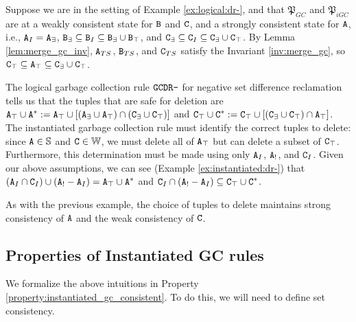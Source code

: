 \begin{example}
Suppose we are in the setting of Example \ref{ex:logical:dr-}, and that $\mathfrak{P}_{GC}$ and $\mathfrak{P}_{iGC}$ are at a weakly consistent state for $\tt{B}$ and $\tt{C}$, and a strongly consistent state for $\tt{A}$, i.e.,
$\tt{A}_I = \tt{A}_\exists$,
$\tt{B}_\exists \subseteq \tt{B}_I \subseteq \tt{B}_\exists \cup \tt{B}_\top$, and
$\tt{C}_\exists \subseteq \tt{C}_I \subseteq \tt{C}_\exists \cup \tt{C}_\top$.
By Lemma \ref{lem:merge_gc_inv}, $\tt{A}_{TS}$, $\tt{B}_{TS}$, and $\tt{C}_{TS}$ satisfy the Invariant \ref{inv:merge_gc}, so $\tt{C}_\top \subseteq \tt{A}_\top \subseteq \tt{C}_\exists \cup \tt{C}_\top$.

The logical garbage collection rule $\tt{GCDR-}$ for negative set difference reclamation tells us that the tuples that are safe for deletion are
$\tt{A}_\top \cup \tt{A}^* := \tt{A}_\top \cup [(\tt{A}_\exists \cup \tt{A}_\top) \cap (\tt{C}_\exists \cup \tt{C}_\top)]$
and
$\tt{C}_\top \cup \tt{C}^* := \tt{C}_\top \cup [(\tt{C}_\exists \cup \tt{C}_\top) \cap \tt{A}_\top]$.
The instantiated garbage collection rule must identify the correct tuples to delete: since $\tt{A} \in \mathbb{S}$ and $\tt{C} \in \mathbb{W}$, we must delete all of $\tt{A}_\top$ but can delete a subset of $\tt{C}_\top$.
Furthermore, this determination must be made using only $\tt{A}_I$, $\tt{A}_!$, and $\tt{C}_I$.
Given our above assumptions, we can see (Example \ref{ex:instantiated:dr-}) that 
$(\tt{A}_I \cap \tt{C}_I) \cup (\tt{A}_! - \tt{A}_I) = \tt{A}_\top \cup \tt{A}^*$
and $\tt{C}_I \cap (\tt{A}_! - \tt{A}_I) \subseteq \tt{C}_\top \cup \tt{C}^*$.

As with the previous example, the choice of tuples to delete maintains strong consistency of $\tt{A}$ and the weak consistency of $\tt{C}$.
\end{example}

\subsection{Properties of Instantiated GC rules}
We formalize the above intuitions in Property \ref{property:instantiated_gc_consistent}.
To do this, we will need to define set consistency.

